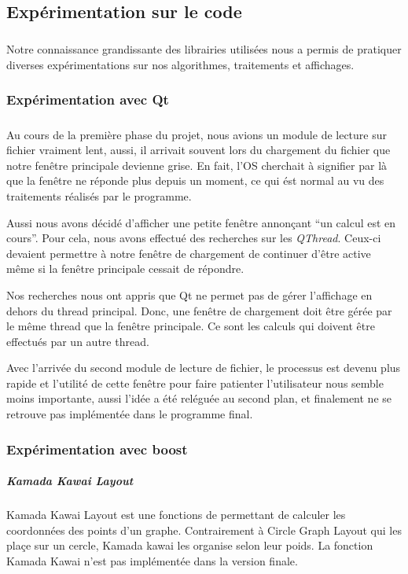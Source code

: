 

\subsection{Expérimentation sur le code}
\subparagraph{}
Notre connaissance grandissante des librairies utilisées nous a permis de pratiquer diverses expérimentations sur nos algorithmes, traitements et affichages.
\subsubsection{Expérimentation avec Qt}
\subparagraph{}
Au cours de la premi\`ere phase du projet, nous avions un module de lecture sur fichier vraiment lent, aussi, il arrivait souvent lors du chargement du fichier que notre fen\^etre principale devienne grise. En fait, l'OS cherchait \`a signifier par l\`a que la fen\^etre ne réponde plus depuis un moment, ce qui \'est normal au vu des traitements réalisés par le programme.

Aussi nous avons décidé d'afficher une petite fen\^etre annon\c cant ``un calcul est en cours''. Pour cela, nous avons effectué des recherches sur les \textit{QThread}. Ceux-ci devaient permettre \`a notre fen\^etre de chargement de continuer d'\^etre active m\^eme si la fen\^etre principale cessait de répondre.

Nos recherches nous ont appris que Qt ne permet pas de gérer l'affichage en dehors du thread principal. Donc, une fen\^etre de chargement doit être g\'er\'ee par le m\^eme thread que la fen\^etre principale. Ce sont les calculs qui doivent \^etre effectu\'es par un autre thread.

Avec l'arriv\'ee du second module de lecture de fichier, le processus est devenu plus rapide et l'utilit\'e de cette fen\^etre pour faire patienter l'utilisateur nous semble moins importante, aussi l'id\'ee a été rel\'egu\'ee au second plan, et finalement ne se retrouve pas impl\'ement\'ee dans le programme final.

\subsubsection{Expérimentation avec boost}

\subparagraph{Kamada Kawai Layout\\}
Kamada Kawai Layout est une fonctions de \boost permettant de calculer les coordonn\'ees des points d'un graphe. Contrairement \`a Circle Graph Layout qui les pla\c ce sur un cercle, Kamada kawai les organise selon leur poids.
La fonction Kamada Kawai n'est pas impl\'ement\'ee dans la version finale.

